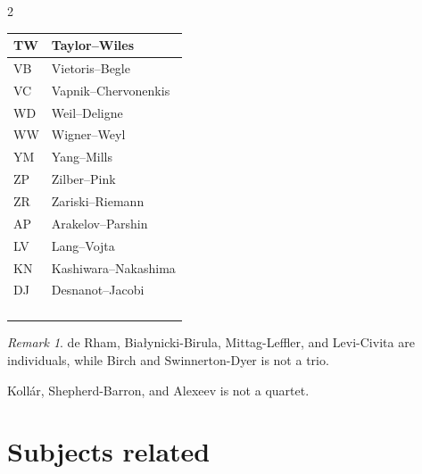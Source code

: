 \documentclass{amsart}
\numberwithin{equation}{section}
\theoremstyle{plain}
\numberwithin{equation}{section}
\theoremstyle{remark}
\newtheorem{remark}[theorem]{Remark}
\begin{document}
\begin{multicols}{2}
{\begin{longtable}{l|l}
TW & Taylor--Wiles\\ \hline
VB & Vietoris--Begle\\ \hline
VC & Vapnik--Chervonenkis\\ \hline
WD & Weil--Deligne\\ \hline
WW & Wigner--Weyl\\ \hline
YM & Yang--Mills\\ \hline
ZP & Zilber--Pink\\ \hline
ZR & Zariski--Riemann\\ \hline
AP & Arakelov--Parshin\\ \hline
LV & Lang--Vojta\\ \hline
KN & Kashiwara--Nakashima\\ \hline
DJ & Desnanot--Jacobi\\ \hline
 & \\ \hline
 & \\ \hline
 & \\ \hline
 & \\ \hline
\end{longtable}
\unskip
\unpenalty
\unpenalty}

\unvbox\ltmcbox




\end{multicols}

\begin{remark}
de Rham, Bia\l{}ynicki-Birula, Mittag-Leffler, and Levi-Civita are individuals, while Birch and Swinnerton-Dyer is not a trio.

Koll\'{a}r, Shepherd-Barron, and Alexeev is not a quartet.
\end{remark}


\section{Subjects related}
\end{document}
